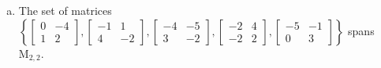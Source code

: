 \begin{exerciseAnswer}
\begin{enumerate}[(a)]
\item The set of matrices \( \left\{ \left[\begin{array}{cc}
0 & -4 \\
1 & 2
\end{array}\right] , \left[\begin{array}{cc}
-1 & 1 \\
4 & -2
\end{array}\right] , \left[\begin{array}{cc}
-4 & -5 \\
3 & -2
\end{array}\right] , \left[\begin{array}{cc}
-2 & 4 \\
-2 & 2
\end{array}\right] , \left[\begin{array}{cc}
-5 & -1 \\
0 & 3
\end{array}\right] \right\} \) spans \(\mathrm{M}_{2,2}\). 
\end{enumerate}
    
\end{exerciseAnswer}
    
